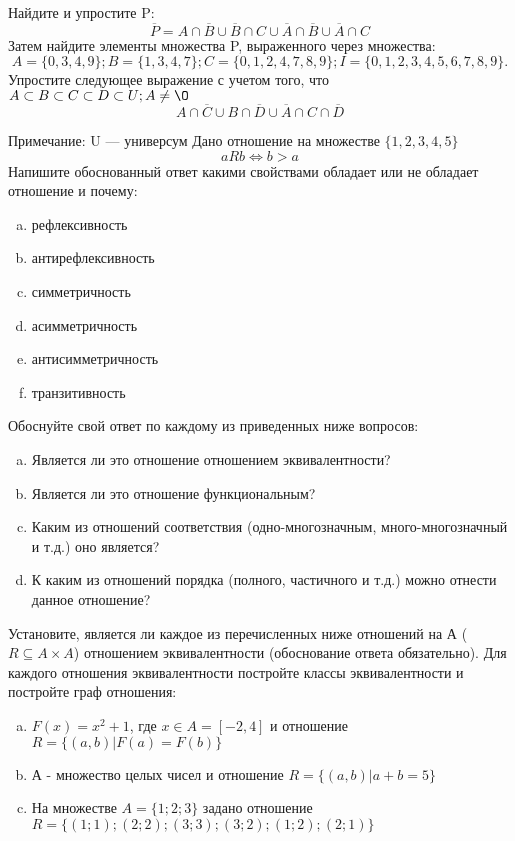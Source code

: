 \documentclass[10pt]{exam}
\begin{document}
\begin{questions}
\question
Найдите и упростите P:
\begin{equation*}
\overline{P} = A \cap \overline{B} \cup \overline{B} \cap C \cup \overline{A} \cap \overline{B} \cup \overline{A} \cap C
\end{equation*}
Затем найдите элементы множества P, выраженного через множества:
\begin{equation*}
A = \{0, 3, 4, 9\}; 
B = \{1, 3, 4, 7\};
C = \{0, 1, 2, 4, 7, 8, 9\};
I = \{0, 1, 2, 3, 4, 5, 6, 7, 8, 9\}.
\end{equation*}\question
Упростите следующее выражение с учетом того, что $A\subset B \subset C \subset D \subset U; A \neq \O$
\begin{equation*}
A \cap  \overline{C} \cup B \cap \overline{D} \cup  \overline{A} \cap C \cap  \overline{D}
\end{equation*}

Примечание: U — универсум\question
Дано отношение на множестве $\{1, 2, 3, 4, 5\}$ 
\begin{equation*}
aRb \iff b > a
\end{equation*}
Напишите обоснованный ответ какими свойствами обладает или не обладает отношение и почему:   
\begin{enumerate} [a)]\setcounter{enumi}{0}
\item рефлексивность
\item антирефлексивность
\item симметричность
\item асимметричность
\item антисимметричность
\item транзитивность
\end{enumerate}

Обоснуйте свой ответ по каждому из приведенных ниже вопросов:
\begin{enumerate} [a)]\setcounter{enumi}{0}
    \item Является ли это отношение отношением эквивалентности?
    \item Является ли это отношение функциональным?
    \item Каким из отношений соответствия (одно-многозначным, много-многозначный и т.д.) оно является?
    \item К каким из отношений порядка (полного, частичного и т.д.) можно отнести данное отношение?
\end{enumerate}

\question
Установите, является ли каждое из перечисленных ниже отношений на А ($R \subseteq A \times A$) отношением эквивалентности (обоснование ответа обязательно). Для каждого отношения эквивалентности постройте классы эквивалентности и постройте граф отношения:
\begin{enumerate} [a)]\setcounter{enumi}{0}
\item $F(x)=x^{2}+1$, где $x \in A = [-2, 4]$ и отношение $R = \{(a,b)|F(a) = F(b)\}$
\item А - множество целых чисел и отношение $R = \{(a,b)|a + b = 5\}$
\item На множестве $A = \{1; 2; 3\}$ задано отношение $R = \{(1; 1); (2; 2); (3; 3); (3; 2); (1; 2); (2; 1)\}$


\end{enumerate}
\end{questions}
\end{document}
